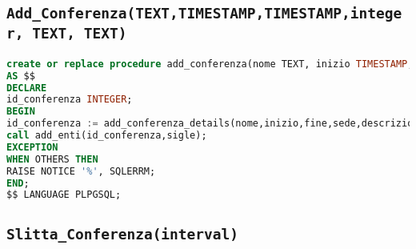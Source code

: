 \subsection{\texttt{Add\_Conferenza(TEXT,TIMESTAMP,TIMESTAMP,integer, TEXT, TEXT)}}
\begin{lstlisting}[language=SQL,style=mystyle]
create or replace procedure add_conferenza(nome TEXT, inizio TIMESTAMP, fine TIMESTAMP, sede INTEGER, descrizione TEXT, sigle TEXT)
AS $$
DECLARE
id_conferenza INTEGER;
BEGIN
id_conferenza := add_conferenza_details(nome,inizio,fine,sede,descrizione);
call add_enti(id_conferenza,sigle);
EXCEPTION
WHEN OTHERS THEN
RAISE NOTICE '%', SQLERRM;
END;
$$ LANGUAGE PLPGSQL;
\end{lstlisting}
\subsection{\texttt{Slitta\_Conferenza(interval)}}
